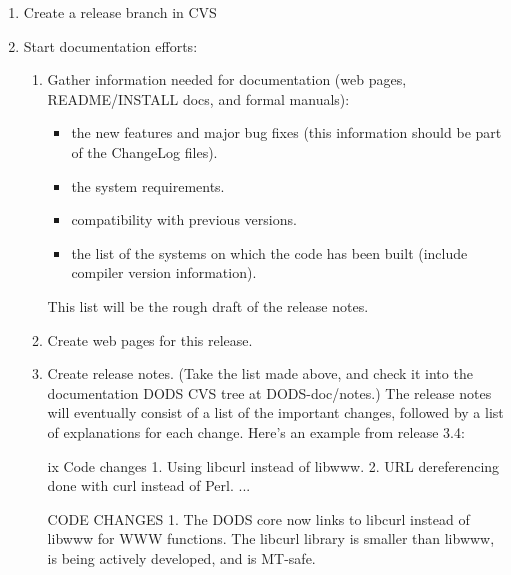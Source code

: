 \documentclass{dods-paper}
\begin{document}
\begin{enumerate}

\item Create a release branch in CVS
\item Start documentation efforts:
  \begin{enumerate}
  \item Gather information needed for documentation (web pages,
    README/INSTALL docs, and formal manuals):
    \begin{itemize}
    \item the new features and major bug fixes (this information
      should be part of the ChangeLog files).
    \item the system requirements.
    \item compatibility with previous versions.
    \item the list of the systems on which the code has
      been built (include compiler version information).
    \end{itemize}
    This list will be the rough draft of the release notes.
  \item Create web pages for this release.
  \item Create release notes.  (Take the list made above, and check it
    into the documentation DODS CVS tree at DODS-doc/notes.)  The
    release notes will eventually consist of a list of the important
    changes, followed by a list of explanations for each change.
    Here's an example from release 3.4:
    \begin{vcode}{ix}
      Code changes
      1.  Using libcurl instead of libwww.
      2.  URL dereferencing done with curl instead of Perl.
      ...

      CODE CHANGES
      1. The DODS core now links to libcurl instead of libwww for WWW
      functions.  The libcurl library is smaller than libwww, is being
      actively developed, and is MT-safe.


\end{vcode}
\end{enumerate}
\end{enumerate}
\end{document}
